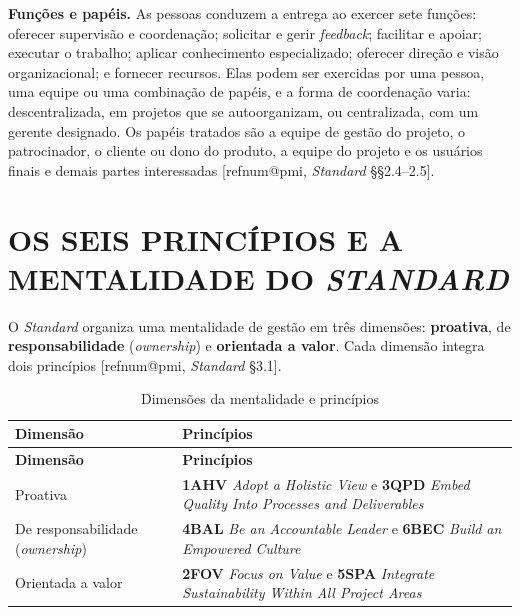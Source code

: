\documentclass[12pt,a4paper,article,oneside,english,brazil]{abntex2}
\makeatletter
\newcommand{\fontetab}[1]{\par\vspace{3pt}{\small\noindent Fonte: #1\par}}
\newcommand{\refnum}[1]{\csname refnum@#1\endcsname}
\newcommand{\cit}[1]{[\refnum{#1}]}
\makeatother
\begin{document}
\textbf{Funções e papéis.} As pessoas conduzem a entrega ao exercer sete funções: oferecer supervisão e coordenação; solicitar e gerir \textit{feedback}; facilitar e apoiar; executar o trabalho; aplicar conhecimento especializado; oferecer direção e visão organizacional; e fornecer recursos. Elas podem ser exercidas por uma pessoa, uma equipe ou uma combinação de papéis, e a forma de coordenação varia: descentralizada, em projetos que se autoorganizam, ou centralizada, com um gerente designado. Os papéis tratados são a equipe de gestão do projeto, o patrocinador, o cliente ou dono do produto, a equipe do projeto e os usuários finais e demais partes interessadas [\refnum{pmi}, \textit{Standard} §§2.4–2.5].

\section{OS SEIS PRINCÍPIOS E A MENTALIDADE DO \textit{STANDARD}}

O \textit{Standard} organiza uma mentalidade de gestão em três dimensões: \textbf{proativa}, de \textbf{responsabilidade} (\textit{ownership}) e \textbf{orientada a valor}. Cada dimensão integra dois princípios [\refnum{pmi}, \textit{Standard} §3.1].

\begingroup\SingleSpacing\small
\begin{longtable}{@{}>{\raggedright\arraybackslash}p{}>{\raggedright\arraybackslash}p{}@{}}
\caption{Dimensões da mentalidade e princípios}\label{tab:t2}\\
\hline
\textbf{Dimensão} & \textbf{Princípios}\\
\hline
\endfirsthead
\hline
\textbf{Dimensão} & \textbf{Princípios}\\
\hline
\endhead
\hline
\endfoot
\hline
\endlastfoot
Proativa & \textbf{1AHV} \textit{Adopt a Holistic View} e \textbf{3QPD} \textit{Embed Quality Into Processes and Deliverables}\\[3pt]
De responsabilidade (\textit{ownership}) & \textbf{4BAL} \textit{Be an Accountable Leader} e \textbf{6BEC} \textit{Build an Empowered Culture}\\[3pt]
Orientada a valor & \textbf{2FOV} \textit{Focus on Value} e \textbf{5SPA} \textit{Integrate Sustainability Within All Project Areas}\\[3pt]
\end{longtable}
\endgroup
\fontetab{Elaborado pelos autores (2026), com base em \cit{pmi}.}
\end{document}
